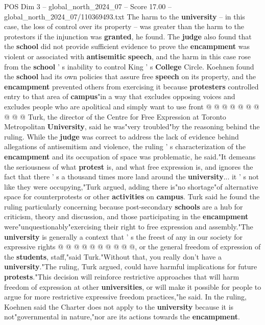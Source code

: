 \begin{textsample}{POS Dim 3 – global\_north\_2024\_07 – Score 17.00 – global\_north\_2024\_07/110369493.txt}
The harm to the \textbf{university} -- in this case, the loss of control over its property -- was greater than the harm to the protestors if the injunction was \textbf{granted}, he found.
The \textbf{judge} also found that the \textbf{school} did not provide sufficient evidence to prove the \textbf{encampment} was violent or associated with \textbf{antisemitic} \textbf{speech}, and the harm in this case rose from the \textbf{school} ' s inability to control King ' s \textbf{College} Circle.
Koehnen found the \textbf{school} had its own policies that assure free \textbf{speech} on its property, and the \textbf{encampment} prevented others from exercising it because \textbf{protesters} controlled entry to that area of \textbf{campus}"in a way that excludes opposing voices and excludes people who are apolitical and simply want to use front @ @ @ @ @ @ @ @ @ @ Turk, the director of the Centre for Free Expression at Toronto Metropolitan \textbf{University}, said he was"very troubled"by the reasoning behind the ruling.
While the \textbf{judge} was correct to address the lack of evidence behind allegations of antisemitism and violence, the ruling ' s characterization of the \textbf{encampment} and its occupation of space was problematic, he said."It demeans the seriousness of what \textbf{protest} is, and what free expression is, and ignores the fact that there ' s a thousand times more land around the \textbf{university}... it ' s not like they were occupying,"Turk argued, adding there is"no shortage"of alternative space for counterprotests or other \textbf{activities} on \textbf{campus}.
Turk said he found the ruling particularly concerning because post-secondary \textbf{schools} are a hub for criticism, theory and discussion, and those participating in the \textbf{encampment} were"unquestionably"exercising their right to free expression and assembly."The \textbf{university} is generally a context that ' s the freest of any in our society for expressive rights @ @ @ @ @ @ @ @ @ @, or the general freedom of expression of the \textbf{students}, staff,"said Turk."Without that, you really don't have a \textbf{university}."The ruling, Turk argued, could have harmful implications for future \textbf{protests}."This decision will reinforce restrictive approaches that will harm freedom of expression at other \textbf{universities}, or will make it possible for people to argue for more restrictive expressive freedom practices,"he said.
In the ruling, Koehnen said the Charter does not apply to the \textbf{university} because it is not"governmental in nature,"nor are its actions towards the \textbf{encampment}.

\end{textsample}
